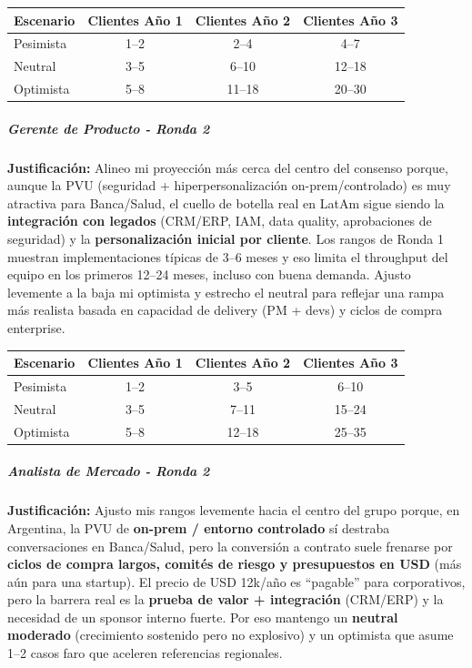 \begin{center}
\footnotesize
\begin{tabular}{|l|c|c|c|}
\hline
\textbf{Escenario} & \textbf{Clientes Año 1} & \textbf{Clientes Año 2} & \textbf{Clientes Año 3} \\
\hline
Pesimista & 1--2 & 2--4 & 4--7 \\
\hline
Neutral & 3--5 & 6--10 & 12--18 \\
\hline
Optimista & 5--8 & 11--18 & 20--30 \\
\hline
\end{tabular}
\end{center}

\subparagraph{Gerente de Producto - Ronda 2}

\textbf{Justificación:} Alineo mi proyección más cerca del centro del consenso porque, aunque la PVU (seguridad + hiperpersonalización on-prem/controlado) es muy atractiva para Banca/Salud, el cuello de botella real en LatAm sigue siendo la \textbf{integración con legados} (CRM/ERP, IAM, data quality, aprobaciones de seguridad) y la \textbf{personalización inicial por cliente}. Los rangos de Ronda 1 muestran implementaciones típicas de 3--6 meses y eso limita el throughput del equipo en los primeros 12--24 meses, incluso con buena demanda. Ajusto levemente a la baja mi optimista y estrecho el neutral para reflejar una rampa más realista basada en capacidad de delivery (PM + devs) y ciclos de compra enterprise.

\begin{center}
\footnotesize
\begin{tabular}{|l|c|c|c|}
\hline
\textbf{Escenario} & \textbf{Clientes Año 1} & \textbf{Clientes Año 2} & \textbf{Clientes Año 3} \\
\hline
Pesimista & 1--2 & 3--5 & 6--10 \\
\hline
Neutral & 3--5 & 7--11 & 15--24 \\
\hline
Optimista & 5--8 & 12--18 & 25--35 \\
\hline
\end{tabular}
\end{center}

\subparagraph{Analista de Mercado - Ronda 2}

\textbf{Justificación:} Ajusto mis rangos levemente hacia el centro del grupo porque, en Argentina, la PVU de \textbf{on-prem / entorno controlado} sí destraba conversaciones en Banca/Salud, pero la conversión a contrato suele frenarse por \textbf{ciclos de compra largos, comités de riesgo y presupuestos en USD} (más aún para una startup). El precio de USD 12k/año es ``pagable'' para corporativos, pero la barrera real es la \textbf{prueba de valor + integración} (CRM/ERP) y la necesidad de un sponsor interno fuerte. Por eso mantengo un \textbf{neutral moderado} (crecimiento sostenido pero no explosivo) y un optimista que asume 1--2 casos faro que aceleren referencias regionales.

